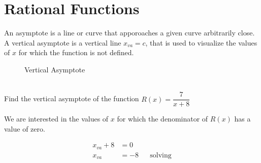 \begin{center}
\end{center}



\section{Rational Functions}\label{Rational Functions}

\begin{definition}[Asympote]

An asymptote is a line or curve that apporoaches a given curve arbitrarily close.\cite{mathworld:asymptote} \\

A vertical asymptote is a vertical line $x_{va}=c$, that is used to visualize the values of $x$ for which the function is not defined. 

\end{definition}

\begin{figure}[ht]
\begin{center}
	
\end{center}
\caption{Vertical Asymptote}
\label{figure:rectangularhyperbola}
\end{figure}

\begin{example}[id:20141111-190212] \label{20141111-190212} \hfill \\

Find the vertical asymptote of the function $R(x)=\dfrac{7}{x+8}$

\soln

\solnsteps

We are interested in the values of $x$ for which the denominator of $R(x)$ has a value of zero.

\begin{align*}
x_{va}+8 &= 0 \\
x_{va} &=-8  &&\text{solving} 
\end{align*}

\begin{center}
	
\end{center}
\end{example}

